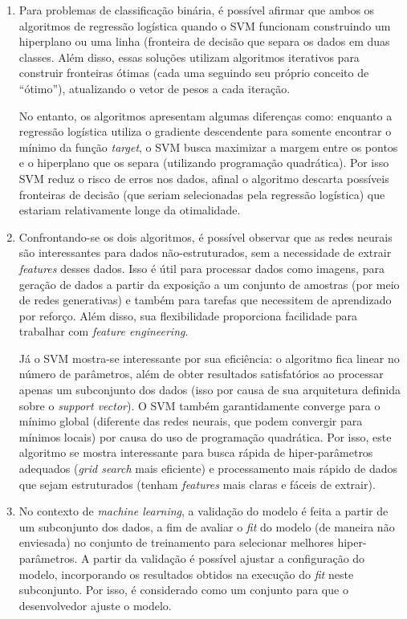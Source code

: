 \documentclass[a4paper,11pt]{article}
\begin{document}
\begin{enumerate}
        \item Para problemas de classificação binária, é possível afirmar que ambos os algoritmos de regressão logística quando o SVM funcionam construindo um hiperplano ou uma linha (fronteira de decisão que separa os dados em duas classes. Além disso, essas soluções utilizam algoritmos iterativos para construir fronteiras ótimas (cada uma seguindo seu próprio conceito de ``ótimo''), atualizando o vetor de pesos a cada iteração.
        
        No entanto, os algoritmos apresentam algumas diferenças como: enquanto a regressão logística utiliza o gradiente descendente para somente encontrar o mínimo da função \textit{target}, o SVM busca maximizar a margem entre os pontos e o hiperplano que os separa (utilizando programação quadrática). Por isso SVM reduz o risco de erros nos dados, afinal o algoritmo descarta possíveis fronteiras de decisão (que seriam selecionadas pela regressão logística) que estariam relativamente longe da otimalidade.

        \item Confrontando-se os dois algoritmos, é possível observar que as redes neurais são interessantes para dados não-estruturados, sem a necessidade de extrair \textit{features} desses dados. Isso é útil para processar dados como imagens, para geração de dados a partir da exposição a um conjunto de amostras (por meio de redes generativas) e também para tarefas que necessitem de aprendizado por reforço. Além disso, sua flexibilidade proporciona facilidade para trabalhar com \textit{feature engineering}.
        
        Já o SVM mostra-se interessante por sua eficiência: o algoritmo fica linear no número de parâmetros, além de obter resultados satisfatórios ao processar apenas um subconjunto dos dados (isso por causa de sua arquitetura definida sobre o \textit{support vector}). O SVM também garantidamente converge para o mínimo global (diferente das redes neurais, que podem convergir para mínimos locais) por causa do uso de programação quadrática. Por isso, este algoritmo se mostra interessante para busca rápida de hiper-parâmetros adequados (\textit{grid search} mais eficiente) e processamento mais rápido de dados que sejam estruturados (tenham \textit{features} mais claras e fáceis de extrair).
        
        \item No contexto de \textit{machine learning}, a validação do modelo é feita a partir de um subconjunto dos dados, a fim de avaliar o \textit{fit} do modelo (de maneira não enviesada) no conjunto de treinamento para selecionar melhores hiper-parâmetros. A partir da validação é possível ajustar a configuração do modelo, incorporando os resultados obtidos na execução do \textit{fit} neste subconjunto. Por isso, é considerado como um conjunto para que o desenvolvedor ajuste o modelo.
        

\end{enumerate}
\end{document}
